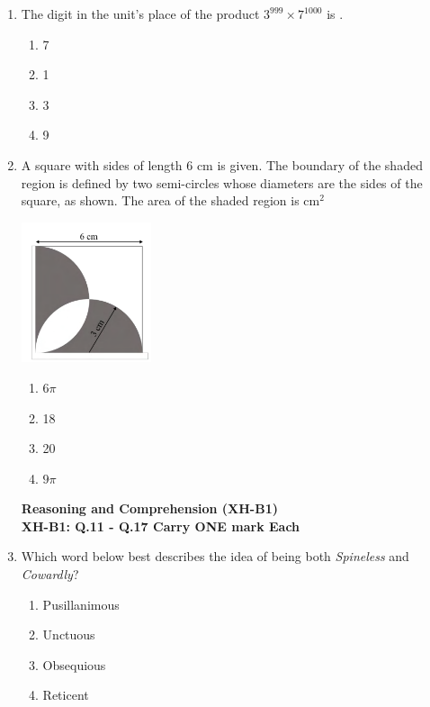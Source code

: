 \documentclass[journal,13pt,onecolumn]{exam}
\theoremstyle{remark}
\begin{document}
\begin{enumerate}[label=Q.\arabic*]
\item The digit in the unit's place of the product \(3^{999} \times 7^{1000}\) is \underline{\hspace{2cm}}.

\begin{enumerate}[label=(\Alph*)]
    \item 7
    \item 1
    \item 3
    \item 9
\end{enumerate}
\item A square with sides of length 6 cm is given. The boundary of the shaded region is defined by two semi-circles whose diameters are the sides of the square, as shown. The area of the shaded region is \underline{\hspace{2cm}} cm\(^2\)
\begin{center}
    \includegraphics[width=0.3\textwidth]{figs/a2q10.png}
\end{center}
\begin{enumerate}
    \item \(6\pi\)
    \item 18
    \item 20
    \item \(9\pi\)
\end{enumerate}
\newpage
\textbf{Reasoning and Comprehension (XH-B1)}\\

\textbf{XH-B1: Q.11 - Q.17 Carry ONE mark Each}

\item Which word below best describes the idea of being both \textit{Spineless} and \textit{Cowardly}?

\begin{enumerate}[label=(\Alph*)]
    \item Pusillanimous
    \item Unctuous
    \item Obsequious
    \item Reticent
\end{enumerate}


\end{enumerate}
\end{document}
